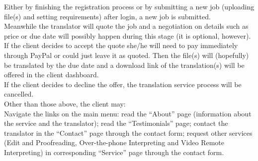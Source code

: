 \documentclass{l3proj}
\begin{document}
Either by finishing the registration process or by submitting a new job
(uploading file(s) and setting requirements) after login, a new job is
submitted.\\

Meanwhile the translator will quote the job and a negotiation on details such as
price or due date will possibly happen during this stage (it is optional,
however).\\

If the client decides to accept the quote she/he will need to pay immediately
through PayPal or could just leave it as quoted. Then the file(s) will
(hopefully) be translated by the due date and a download link of the
translation(s) will be offered in the client dashboard.\\

If the client decides to decline the offer, the translation service process will
be cancelled.\\

Other than those above, the client may: \\

	Navigate the links on the main menu: read the “About” page (information
about the service and the translator); read the “Testimonials” page; contact the
translator in the “Contact” page through the contact form; request other
services (Edit and Proofreading, Over-the-phone Interpreting and Video Remote
Interpreting) in corresponding “Service” page through the contact form. \\


\newpage
\end{document}
